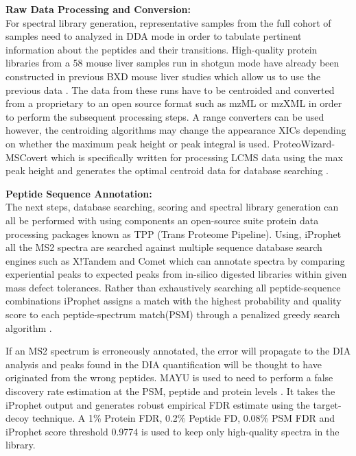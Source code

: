 \documentclass[a4paper,11pt,twoside]{book}
\begin{document}
    \textbf{Raw Data Processing and Conversion:}\\
	For spectral library generation, representative samples from the full cohort of samples need to analyzed in DDA mode in order to tabulate pertinent information about the peptides and their transitions. High-quality protein libraries from a 58 mouse liver samples run in shotgun mode have already been constructed in previous BXD mouse liver studies which allow us to use the previous data \citep{Williams2016SystemsFunction}. The data from these runs have to be centroided and converted from a proprietary to an open source format such as mzML or mzXML in order to perform the subsequent processing steps. A range converters can be used however, the centroiding algorithms may change the appearance XICs depending on whether the maximum peak height or peak integral is used. ProteoWizard-MSCovert which is specifically written for processing LCMS data using the max peak height and generates the optimal centroid data for database searching \citep{Kessner2008ProteoWizard:Development}. 
	
    \textbf{Peptide Sequence Annotation:}\\
	The next steps, database searching, scoring and spectral library generation can all be performed with using components an open-source suite protein data processing packages known as TPP (Trans Proteome Pipeline). Using, iProphet \citep{Shteynberg2011IProphet:Estimates.} all the MS2 spectra are searched against multiple sequence database search engines such as X!Tandem and Comet\citep{Eng2013Comettool} which can annotate spectra by comparing experiential peaks to expected peaks from in-silico digested libraries within given mass defect tolerances. Rather than exhaustively searching all peptide-sequence combinations iProphet assigns a match with the highest probability and quality score to each peptide-spectrum match(PSM) through a penalized greedy search algorithm \citep{Shteynberg2011IProphet:Estimates.}. 

	If an MS2 spectrum is erroneously annotated, the error will propagate to the DIA analysis and peaks found in the DIA quantification will be thought to have originated from the wrong peptides. MAYU is used to need to perform a false discovery rate estimation at the PSM, peptide and protein levels \citep{Reiter2009ProteinSpectrometry}. It takes the iProphet output and generates robust empirical FDR estimate using the target-decoy technique\citep{Elias2007Target-decoySpectrometry}. A 1\% Protein FDR, 0.2\% Peptide FD, 0.08\% PSM FDR and iProphet score threshold 0.9774 is used to keep only high-quality spectra in the library. 
\end{document}
